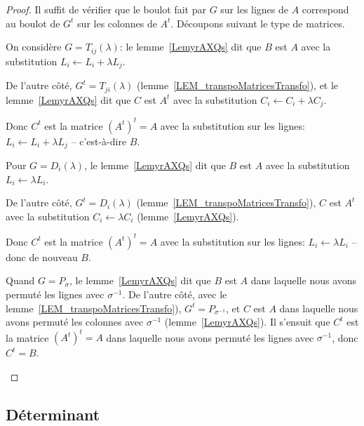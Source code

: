 \begin{proof}
  Il suffit de vérifier que le boulot fait par \( G \) sur les lignes de \( A \) correspond au boulot de \( G^t \) sur les colonnes de \( A^t \). Découpons suivant le type de matrices.
  \begin{subproof}
  \item[Transvections]
    On considère \( G = T_{ij}(\lambda)\): le lemme~\ref{LemyrAXQs} dit que \( B \) est \( A \) avec la substitution \( L_i \leftarrow L_i + \lambda L_j \).
    
    De l'autre côté, \( G^t = T_{ji}(\lambda)\) (lemme~\ref{LEM_transpoMatricesTransfo}),  et le lemme~\ref{LemyrAXQs} dit que \( C \) est \( A^t \) avec la substitution \( C_i \leftarrow C_i + \lambda C_j \).
    
    Donc \( C^t \) est la matrice \( (A^t)^t = A \) avec la substitution sur les lignes:  \( L_i \leftarrow L_i + \lambda L_j \) -- c'est-à-dire \( B \).
  
  \item[Dilatations]
    Pour \( G = D_{i}(\lambda)\), le lemme~\ref{LemyrAXQs} dit que \( B \) est \( A \) avec la substitution \( L_i \leftarrow \lambda L_i \).
    
    De l'autre côté, \( G^t = D_{i}(\lambda)\) (lemme~\ref{LEM_transpoMatricesTransfo}),  \( C \) est \( A^t \) avec la substitution \( C_i \leftarrow \lambda C_i \) (lemme~\ref{LemyrAXQs}).
    
    Donc \( C^t \) est la matrice \( (A^t)^t = A \) avec la substitution sur les lignes:  \( L_i \leftarrow \lambda L_i \) -- donc de nouveau \( B \).
  
  \item[Permutations]
     Quand \( G = P_{\sigma} \), le lemme~\ref{LemyrAXQs} dit que \( B \) est \( A \) dans laquelle nous avons permuté les lignes avec \( \sigma^{-1}\). De l'autre côté, avec le lemme~\ref{LEM_transpoMatricesTransfo}), \( G^t = P_{\sigma^{-1}} \), et \( C \) est \( A \) dans laquelle nous avons permuté les colonnes avec \( \sigma^{-1}\) (lemme~\ref{LemyrAXQs}). Il s'ensuit que \( C^t \) est la matrice \( (A^t)^t = A \) dans laquelle nous avons permuté les lignes avec \( \sigma^{-1}\), donc \( C^t = B \).
  \end{subproof}
\end{proof}

\subsection{Déterminant}


